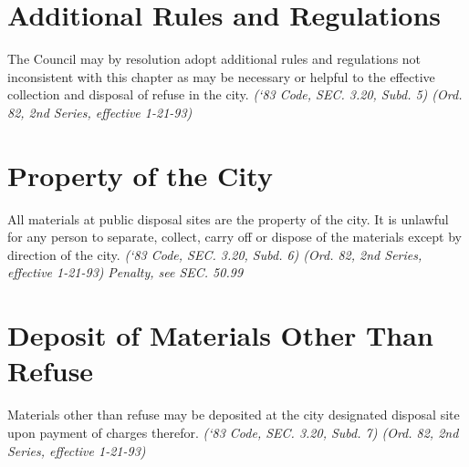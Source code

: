 \section{Additional Rules and Regulations}
The Council may by resolution adopt additional rules and regulations not inconsistent with this chapter as may be necessary or helpful to the effective collection and disposal of refuse in the city.\newline
\emph{(‘83 Code, SEC. 3.20, Subd. 5) (Ord. 82, 2nd Series, effective 1-21-93)}
\section{Property of the City}
All materials at public disposal sites are the property of the city.  It is unlawful for any person to separate, collect, carry off or dispose of the materials except by direction of the city.\newline
\emph{(‘83 Code, SEC. 3.20, Subd. 6) (Ord. 82, 2nd Series, effective 1-21-93)}\newline
\emph{Penalty, see SEC. 50.99}
\section{Deposit of Materials Other Than Refuse}
Materials other than refuse may be deposited at the city designated disposal site upon payment of charges therefor.\newline
\emph{(‘83 Code, SEC. 3.20, Subd. 7) (Ord. 82, 2nd Series, effective 1-21-93)}

%
